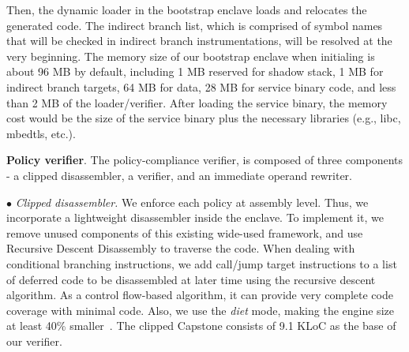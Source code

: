 
Then, the dynamic loader in the bootstrap enclave loads and relocates the generated code. 
The indirect branch list, which is comprised of symbol names that will be checked in indirect branch instrumentations, will be resolved at the very beginning. 
The memory size of our bootstrap enclave when initialing is about 96 MB by default, including 1 MB reserved for shadow stack, 1 MB for indirect branch targets, 64 MB for data, 28 MB for service binary code, and less than 2 MB of the loader/verifier.
After loading the service binary, the memory cost would be the size of the service binary plus the necessary libraries (e.g., libc, mbedtls, etc.).




\vspace{3pt}\noindent\textbf{Policy verifier}.\label{subsec-boundarychecking}
The policy-compliance verifier, is composed of three components - a clipped disassembler, a verifier, and an immediate operand rewriter.

\vspace{2pt}\noindent$\bullet$\textit{ Clipped disassembler.} 
We enforce each policy at assembly level. 
Thus, we incorporate a lightweight disassembler inside the enclave. To implement it, we remove unused components of this existing wide-used framework, and use Recursive Descent Disassembly to traverse the code. When dealing with conditional branching instructions, we add call/jump target instructions to a list of deferred code to be disassembled at later time using the recursive descent algorithm. As a control flow-based algorithm, it can provide very complete code coverage with minimal code.
Also, we use the \textit{diet} mode, making the engine size at least 40\% smaller~\cite{quynh2014capstone}. The clipped Capstone consists of 9.1 KLoC as the base of our verifier.



